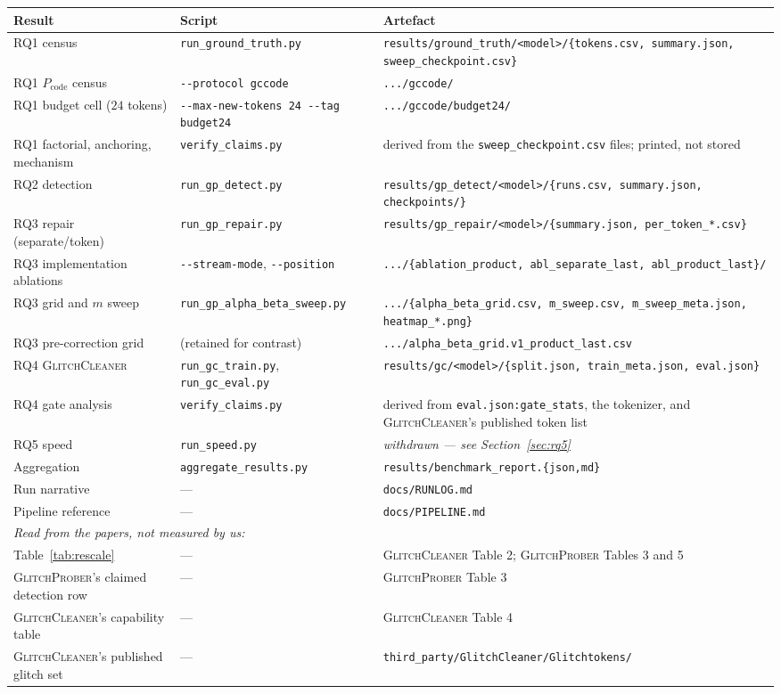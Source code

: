 \documentclass[11pt,a4paper]{article}
\newcommand{\gp}{\textsc{GlitchProber}}
\newcommand{\gc}{\textsc{GlitchCleaner}}
\newcommand{\Pcode}{$P_{\mathrm{code}}$}
\begin{document}
\begin{longtable}{p{4.0cm}p{4.7cm}p{5.3cm}}
\toprule
\textbf{Result} & \textbf{Script} & \textbf{Artefact} \\
\midrule
\endhead
RQ1 census & \texttt{run\_ground\_truth.py} & \texttt{results/ground\_truth/<model>/\{tokens.csv, summary.json, sweep\_checkpoint.csv\}} \\
RQ1 \Pcode{} census & \texttt{-{}-protocol gccode} & \texttt{.../gccode/} \\
RQ1 budget cell ($24$ tokens) & \texttt{-{}-max-new-tokens 24 -{}-tag budget24} & \texttt{.../gccode/budget24/} \\
RQ1 factorial, anchoring, mechanism & \texttt{verify\_claims.py} & derived from the \texttt{sweep\_checkpoint.csv} files; printed, not stored \\
RQ2 detection & \texttt{run\_gp\_detect.py} & \texttt{results/gp\_detect/<model>/\{runs.csv, summary.json, checkpoints/\}} \\
RQ3 repair (separate/token) & \texttt{run\_gp\_repair.py} & \texttt{results/gp\_repair/<model>/\{summary.json, per\_token\_*.csv\}} \\
RQ3 implementation ablations & \texttt{-{}-stream-mode}, \texttt{-{}-position} & \texttt{.../\{ablation\_product, abl\_separate\_last, abl\_product\_last\}/} \\
RQ3 grid and $m$ sweep & \texttt{run\_gp\_alpha\_beta\_sweep.py} & \texttt{.../\{alpha\_beta\_grid.csv, m\_sweep.csv, m\_sweep\_meta.json, heatmap\_*.png\}} \\
RQ3 pre-correction grid & (retained for contrast) & \texttt{.../alpha\_beta\_grid.v1\_product\_last.csv} \\
RQ4 \gc{} & \texttt{run\_gc\_train.py}, \texttt{run\_gc\_eval.py} & \texttt{results/gc/<model>/\{split.json, train\_meta.json, eval.json\}} \\
RQ4 gate analysis & \texttt{verify\_claims.py} & derived from \texttt{eval.json:gate\_stats}, the tokenizer, and \gc{}'s published token list \\
RQ5 speed & \texttt{run\_speed.py} & \emph{withdrawn --- see Section~\ref{sec:rq5}} \\
Aggregation & \texttt{aggregate\_results.py} & \texttt{results/benchmark\_report.\{json,md\}} \\
Run narrative & --- & \texttt{docs/RUNLOG.md} \\
Pipeline reference & --- & \texttt{docs/PIPELINE.md} \\
\midrule
\multicolumn{3}{l}{\emph{Read from the papers, not measured by us:}} \\
Table~\ref{tab:rescale} & --- & \gc{} Table 2; \gp{} Tables 3 and 5 \\
\gp{}'s claimed detection row & --- & \gp{} Table 3 \\
\gc{}'s capability table & --- & \gc{} Table 4 \\
\gc{}'s published glitch set & --- & \texttt{third\_party/GlitchCleaner/Glitchtokens/} \\
\bottomrule
\end{longtable}
\end{document}
